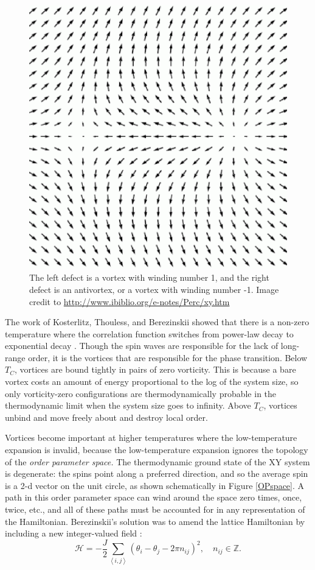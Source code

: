\documentclass[a4paper,10pt]{article}
\newcommand{\beq}{\begin{equation}}
\newcommand{\eeq}{\end{equation}}
\renewcommand{\th}{\theta}
\newcommand{\paren}[1]{\left(#1\right)}
\begin{document}
\begin{figure}
 \centering
 \includegraphics[scale=0.4]{vortices4.eps}
 \caption{The left defect is a vortex with winding number 1, and the 
right defect is an antivortex, or a vortex with winding number -1. Image credit 
to \url{http://www.ibiblio.org/e-notes/Perc/xy.htm}}
\label{vortices}
\end{figure}

The work of Kosterlitz, Thouless, and Berezinskii showed that there is a 
non-zero temperature where the correlation function switches from power-law 
decay to exponential decay \cite{KT}. Though the spin waves are responsible for 
the lack of long-range order, it is the vortices that are responsible for the 
phase transition. Below $T_C$, vortices are bound tightly in pairs of zero 
vorticity. This is because a bare vortex costs an amount of energy proportional 
to the log of the system size, so only vorticity-zero configurations are 
thermodynamically probable in the thermodynamic limit when the system size 
goes to infinity. Above $T_C$, vortices unbind and move freely about and 
destroy local order.

Vortices become important at higher temperatures where the low-temperature 
expansion is invalid, because the low-temperature expansion ignores the 
topology of the \emph{order parameter space.} The thermodynamic ground state of 
the XY system is degenerate: the spins point along a preferred direction, and 
so the average spin is a 2-d vector on the unit circle, as shown schematically 
in Figure \ref{OPspace}. A path in this order parameter space can wind around 
the space zero times, once, twice, etc., and all of these paths must be 
accounted for in any representation of the Hamiltonian. Berezinskii's solution 
was to amend the lattice Hamiltonian by including a new integer-valued field 
\cite{Berezinskii}:
\beq \mathcal{H} = -\frac{J}{2} \sum_{\left \langle i,j \right \rangle} 
\paren{\th_i - \th_j - 2\pi n_{ij} }^2, \quad n_{ij} 
\in \mathbb{Z}.\eeq
\end{document}
